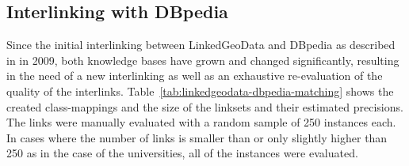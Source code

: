 \subsection{Interlinking with DBpedia}
Since the initial interlinking between LinkedGeoData and DBpedia as described in \cite{linkedgeodata} in 2009, both knowledge bases have
grown and changed significantly, resulting in the need of a new interlinking as well as an exhaustive re-evaluation of the quality of the interlinks.
Table~\ref{tab:linkedgeodata-dbpedia-matching} shows the created class-mappings and the size of the linksets and their estimated precisions.
The links were manually evaluated with a random sample of 250 instances each. In cases where the number of links is smaller
than or only slightly higher than 250 as in the case of the universities, all of the instances were evaluated.
\tymin=1pt
